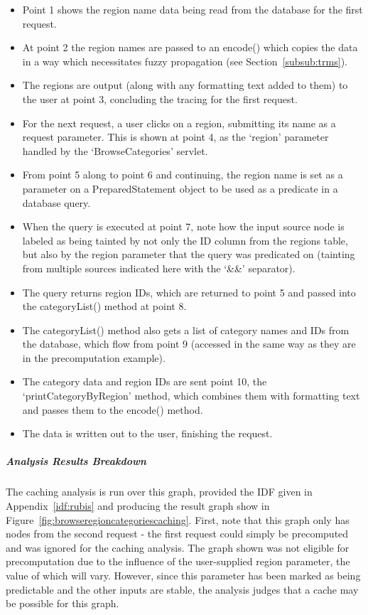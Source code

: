 \documentclass[msc,oneside]{ubcthesis}
\begin{document}
\begin{itemize}
\item Point 1 shows the region name data being read from the database for the first request.
\item At point 2 the region names are passed to an encode() which copies the data in a way which necessitates fuzzy propagation (see Section~\ref{subsub:trms}).
\item The regions are output (along with any formatting text added to them) to the user at point 3, concluding the tracing for the first request.
\item For the next request, a user clicks on a region, submitting its name as a request parameter. This is shown at point 4, as the `region' parameter handled by the `BrowseCategories' servlet.
\item From point 5 along to point 6 and continuing, the region name is set as a parameter on a PreparedStatement object to be used as a predicate in a database query.
\item When the query is executed at point 7, note how the input source node is labeled as being tainted by not only the ID column from the regions table, but also by the region parameter that the query was predicated on (tainting from multiple sources indicated here with the `\&\&' separator).
\item The query returns region IDs, which are returned to point 5 and passed into the categoryList() method at point 8.
\item The categoryList() method also gets a list of category names and IDs from the database, which flow from point 9 (accessed in the same way as they are in the precomputation example).
\item The category data and region IDs are sent point 10, the `printCategoryByRegion' method, which combines them with formatting text and passes them to the encode() method.
\item The data is written out to the user, finishing the request.
\end{itemize}

\subparagraph{Analysis Results Breakdown}
The caching analysis is run over this graph, provided the IDF given in Appendix~\ref{idf:rubis} and producing the result graph show in Figure~\ref{fig:browseregioncategoriescaching}. First, note that this graph only has nodes from the second request - the first request could simply be precomputed and was ignored for the caching analysis. The graph shown was not eligible for precomputation due to the influence of the user-supplied region parameter, the value of which will vary. However, since this parameter has been marked as being predictable and the other inputs are stable, the analysis judges that a cache may be possible for this graph. 
\end{document}
